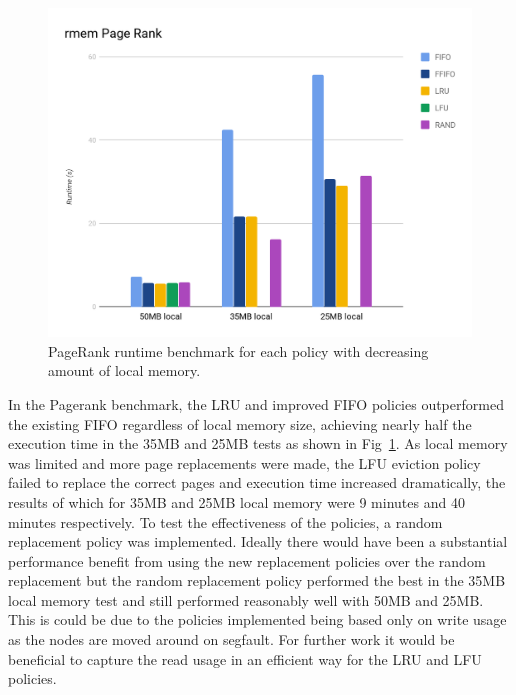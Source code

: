 \begin{figure}[H]
    \includegraphics[width=\columnwidth]{fig/policyPerformance}
    \caption{PageRank runtime benchmark for each policy with decreasing amount of local memory.}
    \label{fig:policyPerformance}
\end{figure}

In the Pagerank benchmark, the LRU and improved FIFO policies outperformed the existing FIFO regardless of local memory size, achieving nearly half the execution time in the 35MB and 25MB tests as shown in Fig~\ref{fig:policyPerformance}. As local memory was limited and more page replacements were made, the LFU eviction policy failed to replace the correct pages and execution time increased dramatically, the results of which for 35MB and 25MB local memory were 9 minutes and 40 minutes respectively. To test the effectiveness of the policies, a random replacement policy was implemented. Ideally there would have been a substantial performance benefit from using the new replacement policies over the random replacement but the random replacement policy performed the best in the 35MB local memory test and still performed reasonably well with 50MB and 25MB. This is could be due to the policies implemented being based only on write usage as the nodes are moved around on segfault. For further work it would be beneficial to capture the read usage in an efficient way for the LRU and LFU policies.

